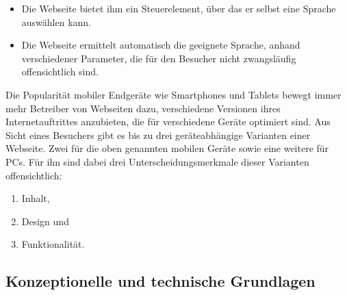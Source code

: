             \begin{itemize}
                \item   Die Webseite bietet ihm ein Steuerelement,
                        über das er selbst eine Sprache auswählen kann.
                \item   Die Webseite ermittelt automatisch die geeignete Sprache,
                        anhand verschiedener Parameter, die für den Besucher nicht zwangsläufig
                        offensichtlich sind.
            \end{itemize}

            Die Popularität mobiler Endgeräte wie Smartphones und Tablets
            bewegt immer mehr Betreiber von Webseiten dazu,
            verschiedene Versionen ihres Internetauftrittes anzubieten,
            die für verschiedene Geräte optimiert sind.
            Aus Sicht eines Besuchers gibt es bis zu drei geräteabhängige
            Varianten einer Webseite. Zwei für die oben genannten mobilen Geräte
            sowie eine weitere für PCs.
            Für ihn sind dabei drei Unterscheidungsmerkmale dieser Varianten offensichtlich:

            \begin{enumerate}
                \item Inhalt,
                \item Design und
                \item Funktionalität.
            \end{enumerate}

        \subsection{Konzeptionelle und technische Grundlagen}